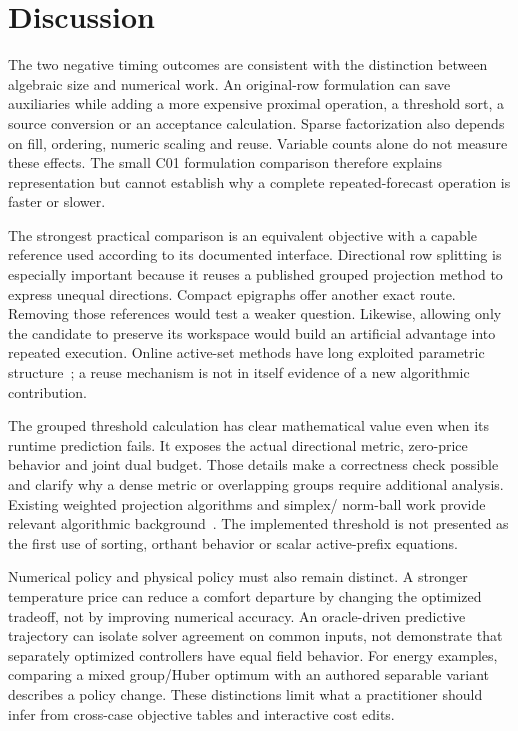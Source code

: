 \section{Discussion}\label{sec:discussion}
The two negative timing outcomes are consistent with the distinction between
algebraic size and numerical work. An original-row formulation can save
auxiliaries while adding a more expensive proximal operation, a threshold
sort, a source conversion or an acceptance calculation. Sparse factorization
also depends on fill, ordering, numeric scaling and reuse. Variable counts
alone do not measure these effects. The small C01 formulation comparison
therefore explains representation but cannot establish why a complete
repeated-forecast operation is faster or slower.

The strongest practical comparison is an equivalent objective with a capable
reference used according to its documented interface. Directional row
splitting is especially important because it reuses a published grouped
projection method to express unequal directions. Compact epigraphs offer
another exact route. Removing those references would test a weaker question.
Likewise, allowing only the candidate to preserve its workspace would build
an artificial advantage into repeated execution. Online active-set methods
have long exploited parametric structure~\cite{qpOASES}; a reuse mechanism
is not in itself evidence of a new algorithmic contribution.

The grouped threshold calculation has clear mathematical value even when
its runtime prediction fails. It exposes the actual directional metric,
zero-price behavior and joint dual budget. Those details make a correctness
check possible and clarify why a dense metric or overlapping groups require
additional analysis. Existing weighted projection algorithms and simplex/
norm-ball work provide relevant algorithmic background~\cite{weighted,duchi,condat}.
The implemented threshold is not presented as the first use of sorting,
orthant behavior or scalar active-prefix equations.

Numerical policy and physical policy must also remain distinct. A stronger
temperature price can reduce a comfort departure by changing the optimized
tradeoff, not by improving numerical accuracy. An oracle-driven predictive
trajectory can isolate solver agreement on common inputs, not demonstrate
that separately optimized controllers have equal field behavior. For energy
examples, comparing a mixed group/Huber optimum with an authored separable
variant describes a policy change. These distinctions limit what a
practitioner should infer from cross-case objective tables and interactive
cost edits.

